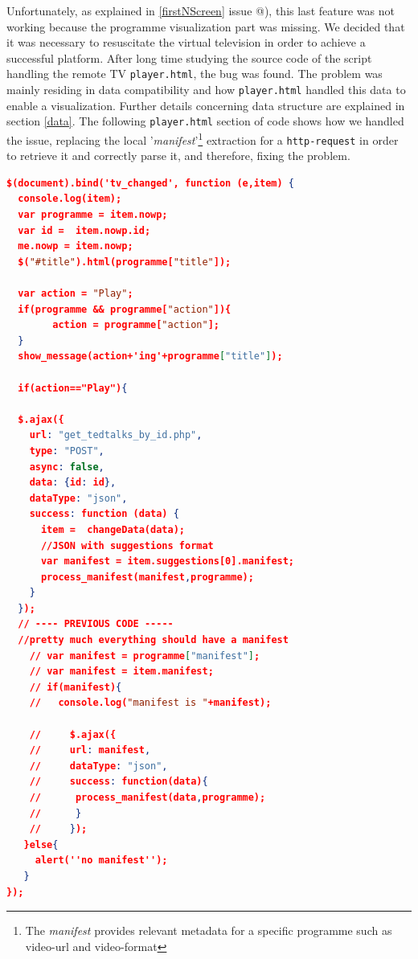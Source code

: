 \documentclass{acm_proc_article-sp}
\makeatletter
\newcommand*{\rom}[1]{\expandafter\@slowromancap\romannumeral #1@}
\makeatother
\begin{document}
Unfortunately, as explained in \ref{firstNScreen} issue \rom{4}), this last feature was not working because the programme visualization part was missing. We decided that it was necessary to resuscitate the virtual television in order to achieve a successful platform. After long time studying the source code of the script handling the remote TV \texttt{player.html}, the bug was found. The problem was mainly residing in data compatibility and how \texttt{player.html} handled this data to enable a visualization. Further details concerning data structure are explained in section \ref{data}. The following \texttt{player.html} section of code shows how we handled the issue, replacing the local '\textit{manifest}'\footnote{The \textit{manifest} provides relevant  metadata for a specific programme such as video-url and video-format} extraction for a \texttt{http-request} in order to retrieve it and correctly parse it, and therefore, fixing the problem. 
\begin{lstlisting}[language=json,firstnumber=1]
$(document).bind('tv_changed', function (e,item) {
  console.log(item);
  var programme = item.nowp;
  var id =  item.nowp.id;
  me.nowp = item.nowp;
  $("#title").html(programme["title"]);

  var action = "Play";
  if(programme && programme["action"]){
        action = programme["action"];
  }  
  show_message(action+'ing'+programme["title"]);

  if(action=="Play"){

  $.ajax({
    url: "get_tedtalks_by_id.php",
    type: "POST",
    async: false,
    data: {id: id},
    dataType: "json",
    success: function (data) {
      item =  changeData(data); 
      //JSON with suggestions format
      var manifest = item.suggestions[0].manifest;
      process_manifest(manifest,programme);
    }
  });
  // ---- PREVIOUS CODE -----
  //pretty much everything should have a manifest
    // var manifest = programme["manifest"];
    // var manifest = item.manifest;
    // if(manifest){
    //   console.log("manifest is "+manifest);
  
    //     $.ajax({
    //     url: manifest,
    //     dataType: "json",
    //     success: function(data){
    //      process_manifest(data,programme);
    //      }
    //     }); 
   }else{
     alert(''no manifest'');
   }
});
\end{lstlisting}
\end{document}
